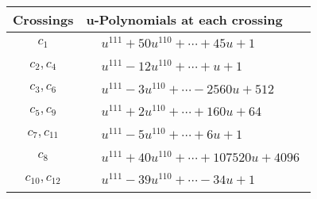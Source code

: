 \documentclass[1p]{elsarticle_modified}
\theoremstyle{definition}
\begin{document}
\begin{tabular}{m{50pt}|m{274pt}}
Crossings & \hspace{64pt}u-Polynomials at each crossing \\
\hline $$\begin{aligned}c_{1}\end{aligned}$$&$\begin{aligned}
&u^{111}+50 u^{110}+\cdots+45 u+1
\end{aligned}$\\
\hline $$\begin{aligned}c_{2},c_{4}\end{aligned}$$&$\begin{aligned}
&u^{111}-12 u^{110}+\cdots+u+1
\end{aligned}$\\
\hline $$\begin{aligned}c_{3},c_{6}\end{aligned}$$&$\begin{aligned}
&u^{111}-3 u^{110}+\cdots-2560 u+512
\end{aligned}$\\
\hline $$\begin{aligned}c_{5},c_{9}\end{aligned}$$&$\begin{aligned}
&u^{111}+2 u^{110}+\cdots+160 u+64
\end{aligned}$\\
\hline $$\begin{aligned}c_{7},c_{11}\end{aligned}$$&$\begin{aligned}
&u^{111}-5 u^{110}+\cdots+6 u+1
\end{aligned}$\\
\hline $$\begin{aligned}c_{8}\end{aligned}$$&$\begin{aligned}
&u^{111}+40 u^{110}+\cdots+107520 u+4096
\end{aligned}$\\
\hline $$\begin{aligned}c_{10},c_{12}\end{aligned}$$&$\begin{aligned}
&u^{111}-39 u^{110}+\cdots-34 u+1
\end{aligned}$\\
\hline
\end{tabular}\\~\\
\newpage\renewcommand{\arraystretch}{1}
\end{document}
